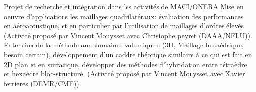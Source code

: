 \documentclass[compress,10pt,aspectratio=169]{beamer}
\begin{document}




\begin{frame}{\large Projet de recherche et intégration dans les activités de MACI/ONERA}%
\small
{\color{onera}Mise en oeuvre d'applications les maillages quadrilatéraux:}  évaluation des performances en aéroacoustique, et en particulier par l'utilisation de maillages d'ordres élevés (Activité proposé par Vincent Mouysset avec Christophe peyret (DAAA/NFLU)).\\\vspace{1cm}
{\color{onera}Extension de la méthode aux domaines volumiques:} (3D, Maillage hexaédrique, besoin certain), développement d'un caddre théorique similaire à ce qui est fait en 2D plan et en surfacique, développer des méthodes d'hybridation entre tétraèdre et hexaèdre bloc-structuré. (Activité proposé par Vincent Mouysset avec  Xavier ferrieres (DEMR/CME)).\\\vspace{0.2cm}
\end{frame}
\end{document}
